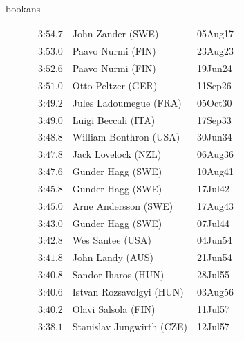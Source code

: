 \begin{exercises}
\begin{Filesave}{bookans}
\begin{figure}
{{\begin{tabular}[t]{|l|ll|}
         $\text{3:54}.7$   &John Zander (SWE)      &05Aug17  \\
         $\text{3:53}.0$   &Paavo Nurmi (FIN)      &23Aug23  \\
         $\text{3:52}.6$   &Paavo Nurmi (FIN)      &19Jun24  \\
         $\text{3:51}.0$   &Otto Peltzer (GER)     &11Sep26  \\
         $\text{3:49}.2$   &Jules Ladoumegue (FRA) &05Oct30  \\
         $\text{3:49}.0$   &Luigi Beccali (ITA)    &17Sep33  \\
         $\text{3:48}.8$   &William Bonthron (USA) &30Jun34  \\
         $\text{3:47}.8$   &Jack Lovelock (NZL)    &06Aug36  \\
         $\text{3:47}.6$   &Gunder Hagg (SWE)      &10Aug41  \\
         $\text{3:45}.8$   &Gunder Hagg (SWE)      &17Jul42  \\
         $\text{3:45}.0$   &Arne Andersson (SWE)   &17Aug43  \\
         $\text{3:43}.0$   &Gunder Hagg (SWE)      &07Jul44  \\
         $\text{3:42}.8$   &Wes Santee (USA)       &04Jun54  \\
         $\text{3:41}.8$   &John Landy (AUS)       &21Jun54  \\
         $\text{3:40}.8$   &Sandor Iharos (HUN)    &28Jul55  \\
         $\text{3:40}.6$   &Istvan Rozsavolgyi (HUN) &03Aug56 \\
         $\text{3:40}.2$   &Olavi Salsola (FIN)    &11Jul57  \\
         $\text{3:38}.1$   &Stanislav Jungwirth (CZE) &12Jul57  \\

\end{tabular}}}
\end{figure}
\end{Filesave}
\end{exercises}
